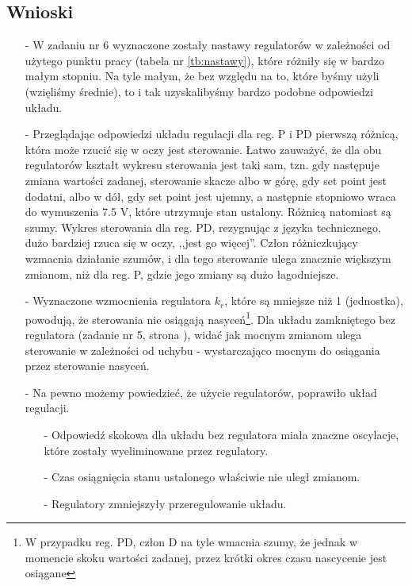\documentclass[11 pt]{article}
\begin{document}
\newpage

\subsection*{Wnioski}

\begin{itemize}
\item[-] W zadaniu nr 6 wyznaczone zostały nastawy regulatorów w zależności od użytego punktu pracy (tabela nr \ref{tb:nastawy}), które różniły się w bardzo małym stopniu. Na tyle małym, że bez względu na to, które byśmy użyli (wzięliśmy średnie), to i tak uzyskalibyśmy bardzo podobne odpowiedzi układu.
\item[-] Przeglądając odpowiedzi układu regulacji dla reg. P i PD pierwszą różnicą, która może rzucić się w oczy jest sterowanie. Łatwo zauważyć, że dla obu regulatorów kształt wykresu sterowania jest taki sam, tzn. gdy następuje zmiana wartości zadanej, sterowanie skacze albo w górę, gdy set point jest dodatni, albo w dół, gdy set point jest ujemny, a następnie stopniowo wraca do wymuszenia 7.5 V, które utrzymuje stan ustalony. Różnicą natomiast są szumy. Wykres sterowania dla reg. PD, rezygnując z języka technicznego, dużo bardziej rzuca się w oczy, ,,jest go więcej''. Człon różniczkujący wzmacnia działanie szumów, i dla tego sterowanie ulega znacznie większym zmianom, niż dla reg. P, gdzie jego zmiany są dużo łagodniejsze.
\item[-] Wyznaczone wzmocnienia regulatora $k_r$, które są mniejsze niż 1 (jednostka), powodują, że sterowania nie osiągają nasyceń\footnote{W przypadku reg. PD, człon D na tyle wmacnia szumy, że jednak w momencie skoku wartości zadanej, przez krótki okres czasu nascycenie jest osiągane}. Dla układu zamkniętego bez regulatora (zadanie nr 5, strona \pageref{fig:zd5}), widać jak mocnym zmianom ulega sterowanie w zależności od uchybu - wystarczająco mocnym do osiągania przez sterowanie nasyceń.
\item[-] Na pewno możemy powiedzieć, że użycie regulatorów, poprawiło układ regulacji. 

\begin{itemize}
\item[-] Odpowiedź skokowa dla układu bez regulatora miała znaczne oscylacje, które zostały wyeliminowane przez regulatory. 
\item[-] Czas osiągnięcia stanu ustalonego właściwie nie uległ zmianom.
\item[-] Regulatory zmniejszyły przeregulowanie układu.
\end{itemize}
\end{itemize}
\end{document}
